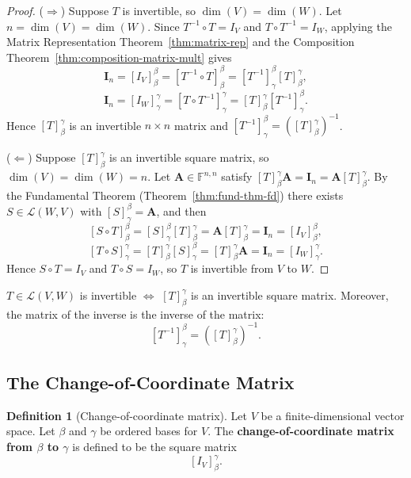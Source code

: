 \documentclass[11pt, a4paper, notitlepage]{report}
\theoremstyle{definition}
\newtheorem{definition}[theorem]{Definition}
\theoremstyle{remark}
\begin{document}
\begin{proof}
($\Rightarrow$)  Suppose $T$ is invertible, so $\dim(V)=\dim(W)$.  Let $n = \dim(V) =
\dim(W)$.  Since $T^{-1} \circ T = I_V$ and $T \circ T^{-1} = I_W$, applying the Matrix
Representation Theorem~\ref{thm:matrix-rep} and the Composition Theorem~\ref{thm:composition-matrix-mult} gives
\[
  \mathbf{I}_n = [I_V]_\beta^\beta = [T^{-1} \circ T]_\beta^\beta
    = \left[T^{-1}\right]_\gamma^\beta [T]_\beta^\gamma,
\]
\[
  \mathbf{I}_n = [I_W]_\gamma^\gamma = [T \circ T^{-1}]_\gamma^\gamma
    = [T]_\beta^\gamma \left[T^{-1}\right]_\gamma^\beta.
\]
Hence $[T]_\beta^\gamma$ is an invertible $n \times n$ matrix and $[T^{-1}]_\gamma^\beta =
([T]_\beta^\gamma)^{-1}$.

($\Leftarrow$)  Suppose $[T]_\beta^\gamma$ is an invertible square matrix, so $\dim(V) =
\dim(W) = n$.  Let $\mathbf{A} \in \mathbb{F}^{n,n}$ satisfy $[T]_\beta^\gamma \mathbf{A}
= \mathbf{I}_n = \mathbf{A}[T]_\beta^\gamma$.  By the Fundamental Theorem
(Theorem~\ref{thm:fund-thm-fd}) there exists $S \in \mathcal{L}(W,V)$ with
$[S]_\gamma^\beta = \mathbf{A}$, and then
\[
  [S \circ T]_\beta^\beta = [S]_\gamma^\beta [T]_\beta^\gamma = \mathbf{A}[T]_\beta^\gamma
  = \mathbf{I}_n = [I_V]_\beta^\beta,
\]
\[
  [T \circ S]_\gamma^\gamma = [T]_\beta^\gamma [S]_\gamma^\beta = [T]_\beta^\gamma\mathbf{A}
  = \mathbf{I}_n = [I_W]_\gamma^\gamma.
\]
Hence $S \circ T = I_V$ and $T \circ S = I_W$, so $T$ is invertible from $V$ to $W$.
\end{proof}

\begin{keyresult}[title={Key Result: Invertibility via the Matrix}]
$T \in \mathcal{L}(V,W)$ is invertible $\iff$ $[T]_\beta^\gamma$ is an invertible square
matrix.  Moreover, the matrix of the inverse is the inverse of the matrix:
\[
  \left[T^{-1}\right]_\gamma^\beta = \left([T]_\beta^\gamma\right)^{-1}.
\]
\end{keyresult}

\subsection{The Change-of-Coordinate Matrix}

\begin{definition}[Change-of-coordinate matrix]
\label{def:change-of-coord}
Let $V$ be a finite-dimensional vector space.  Let $\beta$ and $\gamma$ be ordered bases
for $V$.  The \textbf{change-of-coordinate matrix from $\beta$ to $\gamma$} is defined to
be the square matrix
\[
  [I_V]_\beta^\gamma.
\]
\end{definition}
\end{document}
